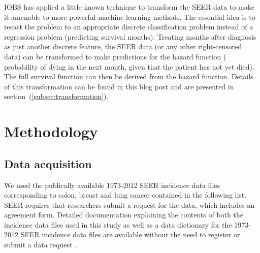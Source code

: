 \documentclass[a4paper,11pt]{article}
\begin{document}
IOBS has applied a little-known technique to transform the SEER data to make it amenable to more powerful machine learning methods. The essential idea is to recast the problem to an appropriate discrete classification problem instead of a regression problem (predicting survival months). Treating months after diagnosis as just another discrete feature, the SEER data (or any other right-censored data) can be transformed to make predictions for the hazard function (
 probability of dying in the next month, given that the patient has not yet died).
The full survival function can then be derived from the hazard function.
Details of this transformation can be found in this blog post \cite{kuhn} and are presented in section~(\ref{subsec:transformation}).












\section{Methodology}


\subsection{Data acquisition}

We used the publically available 1973-2012 SEER incidence data files corresponding to colon, breast and lung cancer contained in the following list.
SEER requires that researchers submit a request for the data, which includes an agreement form. Detailed documentation explaining the contents of both the incidence data files used in this study as well as a data dictionary for the 1973-2012 SEER incidence data files are available without the need to register or submit a data request \cite{seerdoc}.
 
\end{document}
